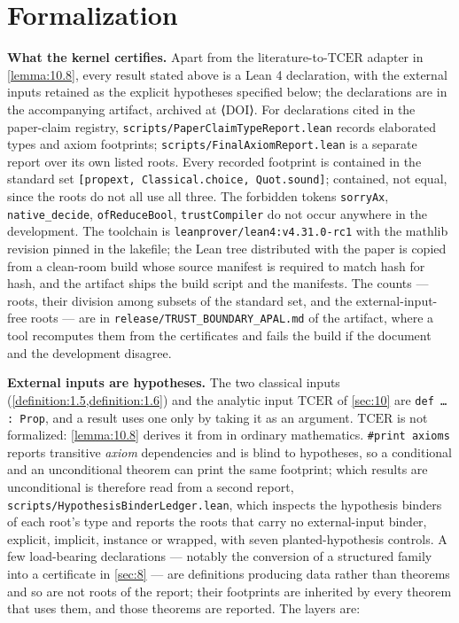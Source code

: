 \section{Formalization}\label{sec:12}
\textbf{What the kernel certifies.} Apart from the literature-to-$\mathrm{TCER}$ adapter in \cref{lemma:10.8}, every result stated above is a Lean 4 declaration, with the external inputs retained as the explicit hypotheses specified below; the declarations are in the accompanying artifact, archived at ⟨DOI⟩. For declarations cited in the paper-claim registry, \texttt{scripts/PaperClaimTypeReport.\allowbreak{}lean} records elaborated types and axiom footprints; \texttt{scripts/FinalAxiomReport.\allowbreak{}lean} is a separate report over its own listed roots. Every recorded footprint is contained in the standard set \texttt{[propext, Classical.\allowbreak{}choice, Quot.\allowbreak{}sound]}; contained, not equal, since the roots do not all use all three. The forbidden tokens \texttt{sorryAx}, \texttt{native\_\allowbreak{}decide}, \texttt{ofReduceBool}, \texttt{trustCompiler} do not occur anywhere in the development. The toolchain is \texttt{leanprover/lean4:v4.\allowbreak{}31.\allowbreak{}0-rc1} with the mathlib revision pinned in the lakefile; the Lean tree distributed with the paper is copied from a clean-room build whose source manifest is required to match hash for hash, and the artifact ships the build script and the manifests. The counts — roots, their division among subsets of the standard set, and the external-input-free roots — are in \texttt{release/TRUST\_\allowbreak{}BOUNDARY\_\allowbreak{}APAL.\allowbreak{}md} of the artifact, where a tool recomputes them from the certificates and fails the build if the document and the development disagree.

\textbf{External inputs are hypotheses.} The two classical inputs (\cref{definition:1.5,definition:1.6}) and the analytic input $\mathrm{TCER}$ of \cref{sec:10} are \texttt{def … : Prop}, and a result uses one only by taking it as an argument. $\mathrm{TCER}$ is not formalized: \cref{lemma:10.8} derives it from \cite{KK26} in ordinary mathematics. \texttt{\#print axioms} reports transitive \emph{axiom} dependencies and is blind to hypotheses, so a conditional and an unconditional theorem can print the same footprint; which results are unconditional is therefore read from a second report, \texttt{scripts/HypothesisBinderLedger.\allowbreak{}lean}, which inspects the hypothesis binders of each root's type and reports the roots that carry no external-input binder, explicit, implicit, instance or wrapped, with seven planted-hypothesis controls. A few load-bearing declarations — notably the conversion of a structured family into a certificate in \cref{sec:8} — are definitions producing data rather than theorems and so are not roots of the report; their footprints are inherited by every theorem that uses them, and those theorems are reported. The layers are:

